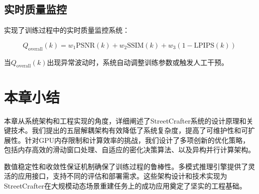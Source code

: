 \subsection{实时质量监控}

实现了训练过程中的实时质量监控系统：

\begin{equation}
Q_{\text{overall}}(k) = w_1 \text{PSNR}(k) + w_2 \text{SSIM}(k) + w_3 (1 - \text{LPIPS}(k))
\label{eq:quality_monitoring}
\end{equation}

当$Q_{\text{overall}}(k)$出现异常波动时，系统自动调整训练参数或触发人工干预。

\section{本章小结}

本章从系统架构和工程实现的角度，详细阐述了StreetCrafter系统的设计原理和关键技术。我们提出的五层解耦架构有效降低了系统复杂度，提高了可维护性和可扩展性。针对GPU内存限制和计算效率的挑战，我们设计了多项创新的优化策略，包括内存高效的滑动窗口处理、自适应的密化决策算法、以及异构并行计算架构。

数值稳定性和收敛性保证机制确保了训练过程的鲁棒性。多模式推理引擎提供了灵活的应用接口，支持不同的评估和部署需求。这些架构设计和技术实现为StreetCrafter在大规模动态场景重建任务上的成功应用奠定了坚实的工程基础。
